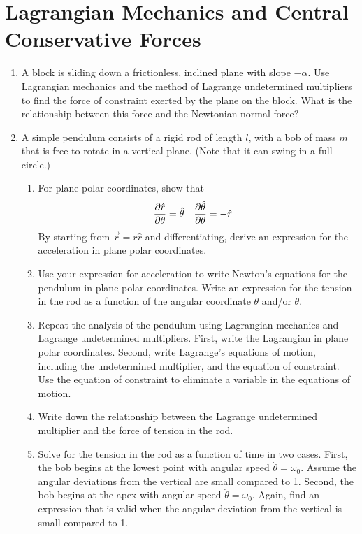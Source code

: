 \documentclass[../psets.tex]{subfiles}
\begin{document}
\section{Lagrangian Mechanics and Central Conservative Forces}
\begin{enumerate}
    \item {}A block is sliding down a frictionless, inclined plane with slope $-\alpha$. Use Lagrangian mechanics and the method of Lagrange undetermined multipliers to find the force of constraint exerted by the plane on the block. What is the relationship between this force and the Newtonian normal force?
    \item A simple pendulum consists of a rigid rod of length $l$, with a bob of mass $m$ that is free to rotate in a vertical plane. (Note that it can swing in a full circle.)
    \begin{enumerate}
        \item For plane polar coordinates, show that
        \begin{align*}
            \pdv{\hat{r}}{\theta} &= \hat{\theta}&
            \pdv{\hat{\theta}}{\theta} &= -\hat{r}
        \end{align*}
        By starting from $\vec{r}=r\hat{r}$ and differentiating, derive an expression for the acceleration in plane polar coordinates.
        \item Use your expression for acceleration to write Newton's equations for the pendulum in plane polar coordinates. Write an expression for the tension in the rod as a function of the angular coordinate $\theta$ and/or $\dot{\theta}$.
        \item Repeat the analysis of the pendulum using Lagrangian mechanics and Lagrange undetermined multipliers. First, write the Lagrangian in plane polar coordinates. Second, write Lagrange's equations of motion, including the undetermined multiplier, and the equation of constraint. Use the equation of constraint to eliminate a variable in the equations of motion.
        \item Write down the relationship between the Lagrange undetermined multiplier and the force of tension in the rod.
        \item Solve for the tension in the rod as a function of time in two cases. First, the bob begins at the lowest point with angular speed $\dot{\theta}=\omega_0$. Assume the angular deviations from the vertical are small compared to 1. Second, the bob begins at the apex with angular speed $\dot{\theta}=\omega_0$. Again, find an expression that is valid when the angular deviation from the vertical is small compared to 1.

\end{enumerate}
\end{enumerate}
\end{document}
